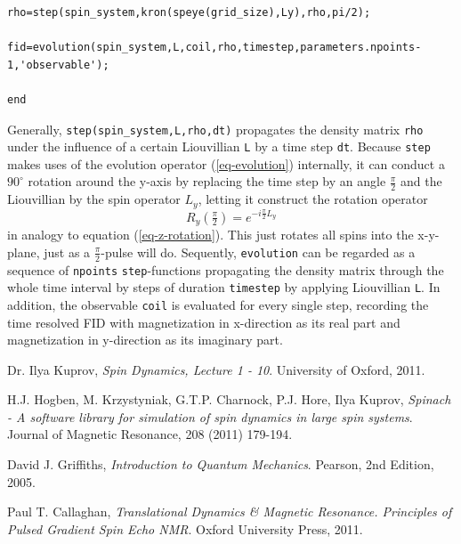 \documentclass[11.5pt,a4paper]{article}
\begin{document}
\begin{lstlisting}[firstnumber=last]
% Apply the pulse
rho=step(spin_system,kron(speye(grid_size),Ly),rho,pi/2);

fid=evolution(spin_system,L,coil,rho,timestep,parameters.npoints-1,'observable');

end
\end{lstlisting}
Generally, \verb$step(spin_system,L,rho,dt)$ propagates the density matrix \verb$rho$ under the influence of a certain Liouvillian \verb$L$ by a time step \verb$dt$. Because \verb$step$ makes uses of the evolution operator (\ref{eq-evolution}) internally, it can conduct a $90^\circ$ rotation around the y-axis by replacing the time step by an angle $\tfrac{\pi}{2}$ and the Liouvillian by the spin operator $L_y$, letting it construct the rotation operator
\begin{equation}
 R_y (\tfrac{\pi}{2}) = e^{-i \tfrac{\pi}{2} L_y}
\end{equation}
in analogy to equation (\ref{eq-z-rotation}). This just rotates all spins into the x-y-plane, just as a $\tfrac{\pi}{2}$-pulse will do. 
Sequently, \verb$evolution$ can be regarded as a sequence of \verb$npoints$ \verb$step$-functions propagating the density matrix through the whole time interval by steps of duration \verb$timestep$ by applying Liouvillian \verb$L$. In addition, the observable \verb$coil$ is evaluated for every single step, recording the time resolved FID with magnetization in x-direction as its real part and magnetization in y-direction as its imaginary part. 

\FloatBarrier
\begin{thebibliography}{9}
  Dr. Ilya Kuprov,
  \emph{Spin Dynamics, Lecture 1 - 10}.
  University of Oxford,
  2011.

  H.J. Hogben, M. Krzystyniak, G.T.P. Charnock, P.J. Hore, Ilya Kuprov,
  \emph{Spinach - A software library for simulation of spin dynamics in large spin systems}.
  Journal of Magnetic Resonance,
  208 (2011) 179-194.

  David J. Griffiths,
  \emph{Introduction to Quantum Mechanics}.
  Pearson, 
  2nd Edition, 
  2005.

  Paul T. Callaghan,
  \emph{Translational Dynamics \& Magnetic Resonance. Principles of Pulsed Gradient Spin Echo NMR}.
  Oxford University Press,
  2011.

\end{thebibliography}
\end{document}
